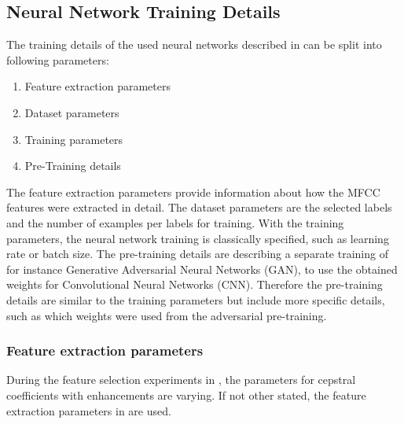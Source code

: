 
\subsection{Neural Network Training Details}\label{sec:exp_details_training}
The training details of the used neural networks described in  can be split into following parameters:
\begin{enumerate}
  \item Feature extraction parameters
  \item Dataset parameters
  \item Training parameters
  \item Pre-Training details
\end{enumerate}
The feature extraction parameters provide information about how the MFCC features were extracted in detail.
The dataset parameters are the selected labels and the number of examples per labels for training.
With the training parameters, the neural network training is classically specified, such as learning rate or batch size.
The pre-training details are describing a separate training of for instance Generative Adversarial Neural Networks (GAN), to use the obtained weights for Convolutional Neural Networks (CNN).
Therefore the pre-training details are similar to the training parameters but include more specific details, such as which weights were used from the adversarial pre-training.



\subsubsection{Feature extraction parameters}
During the feature selection experiments in , the parameters for cepstral coefficients with enhancements are varying.
If not other stated, the feature extraction parameters in  are used.




